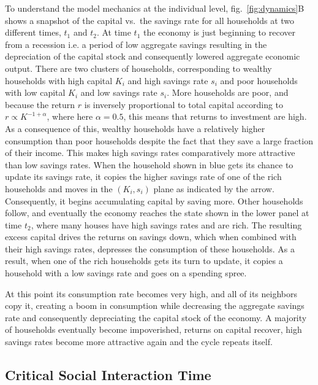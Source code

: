 To understand the model mechanics at the individual level, fig.~\ref{fig:dynamics}B shows a snapshot of the capital vs.~the savings rate for all households at two different times, $t_1$ and $t_2$. 
At time $t_1$ the economy is just beginning to recover from a recession i.e. a period of low aggregate savings resulting in the depreciation of the capital stock and consequently lowered aggregate economic output. 
There are two clusters of households, corresponding to wealthy households with high capital $K_i$ and high savings rate $s_i$ and poor households with low capital $K_i$ and low savings rate $s_i$.
More households are poor, and because the return $r$ is inversely proportional to total capital according to $r \propto K^{-1 + \alpha}$, where here $\alpha = 0.5$, this means that returns to investment are high. 
As a consequence of this, wealthy households have a relatively higher consumption than poor households despite the fact that they save a large fraction of their income. This makes high savings rates comparatively more attractive than low savings rates. 
When the household shown in blue gets its chance to update its savings rate, it copies the higher savings rate of one of the rich households and moves in the $(K_i, s_i)$ plane as indicated by the arrow. Consequently, it begins accumulating capital by saving more.
Other households follow, and eventually the economy reaches the state shown in the lower panel at time $t_2$, where many houses have high savings rates and are rich.
The resulting excess capital drives the returns on savings down, which when combined with their high savings rates, depresses the consumption of these households.
As a result, when one of the rich households gets its turn to update, it copies a household with a low savings rate and goes on a spending spree.  

At this point its consumption rate becomes very high, and all of its neighbors copy it, creating a boom in consumption while decreasing the aggregate savings rate and consequently depreciating the capital stock of the economy.
A majority of households eventually become impoverished, returns on capital recover, high savings rates become more attractive again and the cycle repeats itself.
\newpage
\subsection{Critical Social Interaction Time}
\label{sec:savings_critical_tau}

